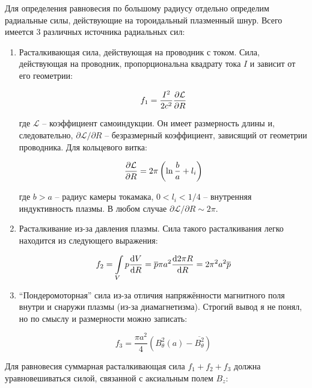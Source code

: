 \documentclass[10pt, a4paper]{article}
\begin{document}
Для определения равновесия по большому радиусу отдельно определим радиальные силы, действующие на тороидальный плазменный шнур. Всего имеется 3 различных источника радиальных сил:

\begin{enumerate}
	
   \item Расталкивающая сила, действующая на проводник с током. Сила, действующая на проводник, пропорциональна квадрату тока $I$ и зависит от его геометрии:
   
   \begin{equation*}
      f_1 = \frac{I^2}{2c^2} \pdv{\mathcal{L}}{R}
   \end{equation*}

   где $\mathcal{L}$ -- коэффициент самоиндукции. Он имеет размерность длины и, следовательно, $\partial\mathcal{L}/\partial R$ -- безразмерный коэффициент, зависящий от геометрии проводника. Для кольцевого витка:
   
   \begin{equation*}
      \pdv{\mathcal{L}}{R} = 2\pi \left(\ln\frac{b}{a} + l_i \right)
   \end{equation*}

   где $b>a$ -- радиус камеры токамака, $0<l_i<1/4$ -- внутренняя индуктивность плазмы. В любом случае $\partial\mathcal{L}/\partial R\sim 2\pi$.

   \item Расталкивание из-за давления плазмы. Сила такого расталкивания легко находится из следующего выражения:
   
   \begin{equation*}
      f_2 = \int\limits_{V} p \dv{V}{R} = \overline{p} \pi a^2 \dv{2\pi R}{R} = 2\pi^2 a^2 \overline{p}
   \end{equation*}

   \item ``Пондеромоторная'' сила из-за отличия напряжённости магнитного поля внутри и снаружи плазмы (из-за диамагнетизма). Строгий вывод я не понял, но по смыслу и размерности можно записать:
   
   \begin{equation*}
      f_3 = \frac{\pi a^2}{4}\left( B_\theta^2(a) - \overline{B_\theta^2} \right)
   \end{equation*}

\end{enumerate}

Для равновесия суммарная расталкивающая сила $f_1+f_2+f_3$ должна уравновешиваться силой, связанной с аксиальным полем $B_z$:
\end{document}
